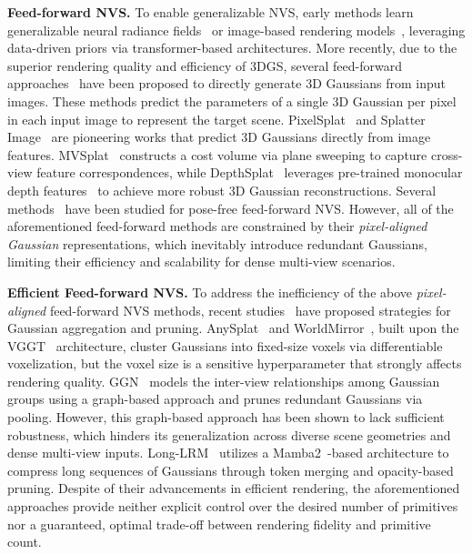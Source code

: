 \noindent \textbf{Feed-forward NVS.} 
To enable generalizable NVS, early methods learn generalizable neural radiance fields~\cite{pixelnerf, mvsnerf, nerf_attention} or image-based rendering models~\cite{ibrnet, neuray, gpnr}, leveraging data-driven priors via transformer-based architectures. More recently, due to the superior rendering quality and efficiency of 3DGS, several feed-forward approaches~\cite{charatan2024pixelsplat, szymanowicz2024splatter, chen2024mvsplat, xu2025depthsplat, kang2025selfsplat, ye2024no, huang2025no, zhang2024gs} have been proposed to directly generate 3D Gaussians from input images. These methods predict the parameters of a single 3D Gaussian per pixel in each input image to represent the target scene. PixelSplat~\cite{charatan2024pixelsplat} and Splatter Image~\cite{szymanowicz2024splatter} are pioneering works that predict 3D Gaussians directly from image features. MVSplat~\cite{chen2024mvsplat} constructs a cost volume via plane sweeping to capture cross-view feature correspondences, while DepthSplat~\cite{xu2025depthsplat} leverages pre-trained monocular depth features~\cite{yang2024depth} to achieve more robust 3D Gaussian reconstructions. Several methods~\cite{hong2024unifying, kang2025selfsplat, li2024ggrt, ye2024no, huang2025no} have been studied for pose-free feed-forward NVS. However, all of the aforementioned feed-forward methods are constrained by their \textit{pixel-aligned Gaussian} representations, which inevitably introduce redundant Gaussians, limiting their efficiency and scalability for dense multi-view scenarios.

\noindent \textbf{Efficient Feed-forward NVS.} 
To address the inefficiency of the above \textit{pixel-aligned} feed-forward NVS methods, recent studies~\cite{jiang2025anysplat, zhang2024gaussian, ziwen2025long, liu2025worldmirror} have proposed strategies for Gaussian aggregation and pruning. AnySplat~\cite{jiang2025anysplat} and WorldMirror~\cite{liu2025worldmirror}, built upon the VGGT~\cite{wang2025vggt} architecture, cluster Gaussians into fixed-size voxels via differentiable voxelization, but the voxel size is a sensitive hyperparameter that strongly affects rendering quality. GGN~\cite{zhang2024gaussian} models the inter-view relationships among Gaussian groups using a graph-based approach and prunes redundant Gaussians via pooling. However, this graph-based approach has been shown to lack sufficient robustness, which hinders its generalization across diverse scene geometries and dense multi-view inputs.
Long-LRM~\cite{ziwen2025long} utilizes a Mamba2~\cite{dao2024transformers}-based architecture to compress long sequences of Gaussians through token merging and opacity-based pruning. Despite of their advancements in efficient rendering, the aforementioned approaches provide neither explicit control over the desired number of primitives nor a guaranteed, optimal trade-off between rendering fidelity and primitive count.
